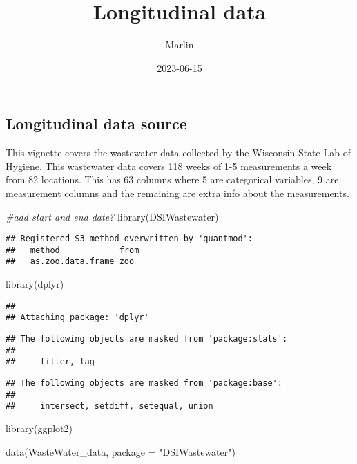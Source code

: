 \documentclass[
]{article}
\title{Longitudinal data}
\author{Marlin}
\date{2023-06-15}
\newenvironment{Shaded}{\begin{snugshade}}{\end{snugshade}}
\newcommand{\AttributeTok}[1]{\textcolor[rgb]{0.77,0.63,0.00}{#1}}
\newcommand{\CommentTok}[1]{\textcolor[rgb]{0.56,0.35,0.01}{\textit{#1}}}
\newcommand{\FunctionTok}[1]{\textcolor[rgb]{0.00,0.00,0.00}{#1}}
\newcommand{\NormalTok}[1]{#1}
\newcommand{\StringTok}[1]{\textcolor[rgb]{0.31,0.60,0.02}{#1}}
\begin{document}
\maketitle

\hypertarget{longitudinal-data-source}{%
\subsection{Longitudinal data source}\label{longitudinal-data-source}}

This vignette covers the wastewater data collected by the Wisconsin
State Lab of Hygiene. This wastewater data covers 118 weeks of 1-5
measurements a week from 82 locations. This has 63 columns where 5 are
categorical variables, 9 are measurement columns and the remaining are
extra info about the measurements.

\begin{Shaded}
\begin{Highlighting}[]
\CommentTok{\#add start and end date?}
\FunctionTok{library}\NormalTok{(DSIWastewater)}
\end{Highlighting}
\end{Shaded}

\begin{verbatim}
## Registered S3 method overwritten by 'quantmod':
##   method            from
##   as.zoo.data.frame zoo
\end{verbatim}

\begin{Shaded}
\begin{Highlighting}[]
\FunctionTok{library}\NormalTok{(dplyr)}
\end{Highlighting}
\end{Shaded}

\begin{verbatim}
## 
## Attaching package: 'dplyr'
\end{verbatim}

\begin{verbatim}
## The following objects are masked from 'package:stats':
## 
##     filter, lag
\end{verbatim}

\begin{verbatim}
## The following objects are masked from 'package:base':
## 
##     intersect, setdiff, setequal, union
\end{verbatim}

\begin{Shaded}
\begin{Highlighting}[]
\FunctionTok{library}\NormalTok{(ggplot2)}

\FunctionTok{data}\NormalTok{(WasteWater\_data, }\AttributeTok{package =} \StringTok{"DSIWastewater"}\NormalTok{)}
\end{Highlighting}
\end{Shaded}
\end{document}
